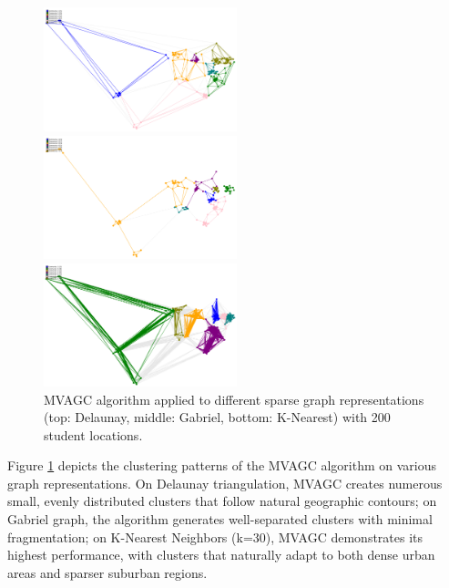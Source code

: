 \begin{figure}[!ht]
\centering
\includegraphics[width=0.5\textwidth]{./img/MVAGC_Delaunay}
\vspace{0.5cm}

\includegraphics[width=0.5\textwidth]{./img/MVAGC_Gabriel}
\vspace{0.5cm}

\includegraphics[width=0.5\textwidth]{./img/MVAGC_K}

\caption{MVAGC algorithm applied to different sparse graph representations (top: Delaunay, middle: Gabriel, bottom: K-Nearest) with 200 student locations.}
\label{fig:mvagc_clustering}
\end{figure}

Figure \ref{fig:mvagc_clustering} depicts the clustering patterns of the MVAGC algorithm on various graph representations. On Delaunay triangulation, MVAGC creates numerous small, evenly distributed clusters that follow natural geographic contours; on Gabriel graph, the algorithm generates well-separated clusters with minimal fragmentation; on K-Nearest Neighbors (k=30), MVAGC demonstrates its highest performance, with clusters that naturally adapt to both dense urban areas and sparser suburban regions.

